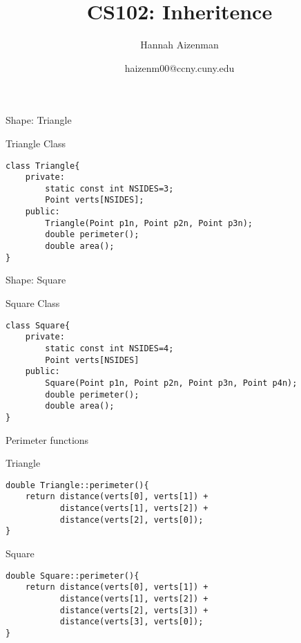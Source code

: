 \documentclass[xcolor={dvipsnames}]{beamer}
\begin{document}
\title{ CS102: Inheritence}
\author{Hannah Aizenman}
\date{haizenm00@ccny.cuny.edu}


\begin{frame}
	\titlepage
\end{frame}

\begin{frame}{Shape: Triangle}
\end{frame}

\begin{frame}[fragile]{Triangle Class}
\begin{verbatim}
class Triangle{
    private:
        static const int NSIDES=3;
        Point verts[NSIDES];
    public:
        Triangle(Point p1n, Point p2n, Point p3n);
        double perimeter();
        double area();
}
\end{verbatim}
\end{frame}


\begin{frame}{Shape: Square}
\begin{center}
\end{center}
\end{frame}

\begin{frame}[fragile]{Square Class}
\begin{verbatim}
class Square{
    private:
        static const int NSIDES=4;
        Point verts[NSIDES]
    public:
        Square(Point p1n, Point p2n, Point p3n, Point p4n);
        double perimeter();
        double area();
}
\end{verbatim}
\end{frame}

\begin{frame}[fragile]{Perimeter functions} 
\begin{block}{Triangle}
\begin{verbatim}
double Triangle::perimeter(){
    return distance(verts[0], verts[1]) + 
           distance(verts[1], verts[2]) + 
           distance(verts[2], verts[0]);
}
\end{verbatim}
\end{block}
\pause
\begin{block}{Square}
\begin{verbatim}
double Square::perimeter(){
    return distance(verts[0], verts[1]) + 
           distance(verts[1], verts[2]) + 
           distance(verts[2], verts[3]) +
           distance(verts[3], verts[0]);
}
\end{verbatim}
\end{block}
\end{frame}
\end{document}
